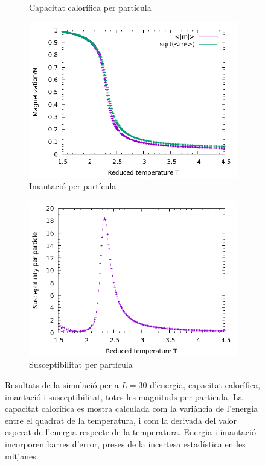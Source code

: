 \documentclass[a4paper]{article}
\begin{document}
\begin{figure}[H]
\begin{subfigure}{.45\textwidth}
        \caption{Capacitat calorífica per partícula}
        \label{fig:props-cv}
    \end{subfigure}
        \begin{subfigure}{.45\textwidth}
        \centering
        \includegraphics[width=\textwidth]{props-L-030_m.png}
        \caption{Imantació per partícula}
        \label{fig:props-m}
    \end{subfigure}
    \begin{subfigure}{.45\textwidth}
        \centering
        \includegraphics[width=\textwidth]{props-L-030_xn.png}
        \caption{Susceptibilitat per partícula}
        \label{fig:props-x}
    \end{subfigure}
    \caption{Resultats de la simulació per a $L=30$ d'energia, capacitat calorífica, imantació i susceptibilitat, totes les magnituds per partícula. La capacitat calorífica es mostra calculada com la variància de l'energia entre el quadrat de la temperatura, i com la derivada del valor esperat de l'energia respecte de la temperatura. Energia i imantació incorporen barres d'error, preses de la incertesa estadística en les mitjanes.}
\label{fig:props}
\end{figure}
\end{document}
